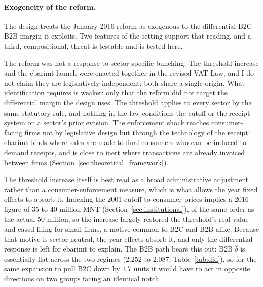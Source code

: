 \documentclass[12pt,oneside,a4paper]{report}
\begin{document}
\paragraph{Exogeneity of the reform.}
The design treats the January 2016 reform as exogenous to the differential B2C--B2B margin it exploits. Two features of the setting support that reading, and a third, compositional, threat is testable and is tested here.

The reform was not a response to sector-specific bunching. The threshold increase and the ebarimt launch were enacted together in the revised VAT Law, and I do not claim they are legislatively independent; both share a single origin. What identification requires is weaker: only that the reform did not target the differential margin the design uses. The threshold applies to every sector by the same statutory rule, and nothing in the law conditions the cutoff or the receipt system on a sector's prior evasion. The enforcement shock reaches consumer-facing firms not by legislative design but through the technology of the receipt: ebarimt binds where sales are made to final consumers who can be induced to demand receipts, and is close to inert where transactions are already invoiced between firms (Section~\ref{sec:theoretical_framework}).

The threshold increase itself is best read as a broad administrative adjustment rather than a consumer-enforcement measure, which is what allows the year fixed effects to absorb it. Indexing the 2001 cutoff to consumer prices implies a 2016 figure of 35 to 40 million MNT (Section~\ref{sec:institutional}), of the same order as the actual 50 million, so the increase largely restored the threshold's real value and eased filing for small firms, a motive common to B2C and B2B alike. Because that motive is sector-neutral, the year effects absorb it, and only the differential response is left for ebarimt to explain. The B2B path bears this out: B2B $\hat{b}$ is essentially flat across the two regimes ($2.252$ to $2.087$; Table~\ref{tab:did}), so for the same expansion to pull B2C down by $1.7$ units it would have to act in opposite directions on two groups facing an identical notch.
\end{document}
